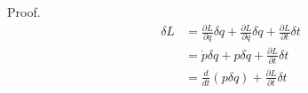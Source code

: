 \documentclass{beamer}
\begin{document}
\begin{frame}
\begin{block}{Proof.}
\begin{align*}
\delta L & = \frac{\partial L}{\partial q} \delta q + \frac{\partial L}{\partial \dot{q}} \delta \dot{q} + \frac{\partial L}{\partial t} \delta t \\
& = \dot{p} \delta q + p \delta \dot{q} + \frac{\partial L}{\partial t} \delta t \\
& = \frac{d}{dt} \left( p \delta q \right) + \frac{\partial L}{\partial t} \delta t
\end{align*}
\end{block}
\end{frame}
\end{document}
